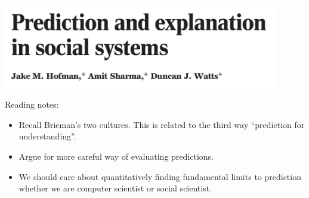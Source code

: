 \documentclass[aspectratio=169]{beamer}
\begin{document}
\begin{frame}

\begin{center}
  \includegraphics[width = 0.9\textwidth]{figures/hofman_prediction_2017_title}
\end{center}

\end{frame}
\begin{frame}

Reading notes:
\begin{itemize}
\item Recall Brieman's two cultures.  This is related to the third way ``prediction for understanding''.
\pause
\item Argue for more careful way of evaluating predictions.
\pause
\item We should care about quantitatively finding fundamental limits to prediction whether we are computer scientist or social scientist.
\end{itemize} 

\end{frame}


\frame{\titlepage}
\end{document}
